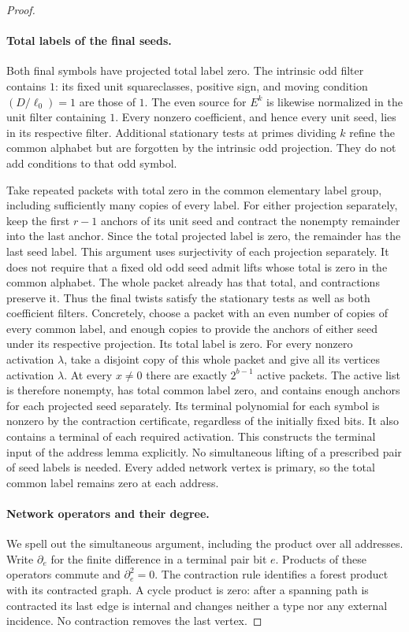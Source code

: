 \documentclass[11pt]{article}
\theoremstyle{definition}
\theoremstyle{remark}
\begin{document}
\begin{proof}\leavevmode
\paragraph{Total labels of the final seeds.}
Both final symbols have projected total label zero. The intrinsic
odd filter contains $1$: its fixed unit squareclasses, positive sign,
and moving condition $(D/\ell_0)=1$ are those of $1$. The even source
for $E^k$ is likewise normalized in the unit filter containing $1$.
Every nonzero coefficient, and hence every unit seed, lies in its
respective filter. Additional stationary tests at primes dividing
$k$ refine the common alphabet but are forgotten by the intrinsic
odd projection. They do not add conditions to that odd symbol.

Take repeated packets with total zero in the common elementary
label group, including sufficiently many copies of every label.
For either projection separately, keep the first $r-1$ anchors of
its unit seed and contract the nonempty remainder into the last
anchor. Since the total projected label is zero, the remainder has
the last seed label. This argument uses surjectivity of each
projection separately. It does not require that a fixed old odd
seed admit lifts whose total is zero in the common alphabet.
The whole packet already has that total, and contractions preserve
it. Thus the final twists satisfy the stationary tests as well as
both coefficient filters.
Concretely, choose a packet with an even number of copies of every
common label, and enough copies to provide the anchors of either
seed under its respective projection.  Its total label is zero.
For every nonzero activation $\lambda$, take a disjoint copy of
this whole packet and give all its vertices activation $\lambda$.
At every $x\ne0$ there are exactly $2^{b-1}$ active packets.
The active list is therefore nonempty, has total common label zero,
and contains enough anchors for each projected seed separately.
Its terminal polynomial for each symbol is nonzero by the
contraction certificate, regardless of the initially fixed bits.
It also contains a terminal of each required activation.  This
constructs the terminal input of the address lemma explicitly.
No simultaneous lifting of a prescribed pair of seed labels is
needed.  Every added network vertex is primary, so the total
common label remains zero at each address.

\paragraph{Network operators and their degree.}
We spell out the simultaneous argument, including the product over
all addresses.  Write $\partial_e$ for the finite difference in a
terminal pair bit $e$.  Products of these operators commute and
$\partial_e^2=0$.  The contraction rule identifies a forest product
with its contracted graph.  A cycle product is zero: after a
spanning path is contracted its last edge is internal and changes
neither a type nor any external incidence.  No contraction removes
the last vertex.


\end{proof}
\end{document}
